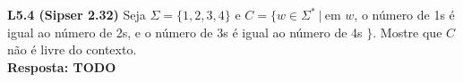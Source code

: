 
\noindent \textbf{L5.4 (Sipser 2.32)} Seja $\Sigma = \{1, 2, 3, 4\}$ e $C = \{w \in \Sigma^* \ |\ $em $w$, o número de 1s é igual ao número de 2s, e o número de 3s é igual ao número de 4s $\}$. Mostre que $C$ não é livre do contexto.\\[3pt]
\textbf{Resposta: TODO}
